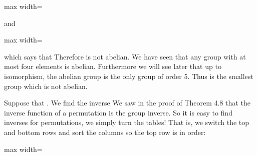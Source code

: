 \documentclass[11pt,oneside]{article}
\begin{document}
\begin{BookBody}

\begin{center}\begin{adjustbox}{max width=\linewidth}\end{adjustbox}\end{center}

\noindent and

\begin{center}\begin{adjustbox}{max width=\linewidth}\end{adjustbox}\end{center}

\noindent which says that  Therefore  is not abelian. We have seen that any group with at most four elements is abelian. Furthermore we will see later that up to isomorphism, the abelian group  is the only group of order 5. Thus  is the smallest group which is not abelian.

Suppose that . We find the inverse  We saw in the proof of Theorem 4.8 that the inverse function of a permutation is the group inverse. So it is easy to find inverses for permutations, we simply turn the tables! That is, we switch the top and bottom rows and sort the columns so the top row is in order:


\begin{center}\begin{adjustbox}{max width=\linewidth}\end{adjustbox}\end{center} \BookEnd{\blacktriangle}


\end{BookBody}
\end{document}
